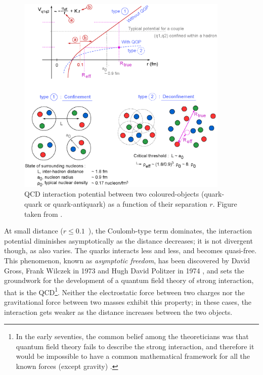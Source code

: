 \begin{figure}[t]
	\centering
	\includegraphics[width=0.9\textwidth]{Figs/Chapter2/GraphePotentiel.eps}
	\caption{QCD interaction potential between two coloured-objects (quark-quark or quark-antiquark) as a function of their separation $r$. Figure taken from \cite{maireProductionBaryonsMultietranges2011}.}
	\label{fig:QCDPotential}
\end{figure}

At small distance ($r \leq 0.1$~\fm), the Coulomb-type term dominates, the interaction potential diminishes asymptotically as the distance decreases; it is not divergent though, as \alphaS also varies. The quarks interacts less and less, and becomes quasi-free. This phenomenon, known as \textit{asymptotic freedom}, has been discovered by David Gross, Frank Wilczek in 1973 \cite{grossUltravioletBehaviorNonAbelian1973} and Hugh David Politzer in 1974 \cite{davidpolitzerAsymptoticFreedomApproach1974}, and sets the groundwork for the development of a quantum field theory of strong interaction, that is the QCD\footnote{In the early seventies, the common belief among the theoreticians was that quantum field theory fails to describe the strong interaction, and therefore it would be impossible to have a common mathematical framework for all the known forces (except gravity) \cite{s.glashowInteractionsJourneyMind1990}.}. Neither the electrostatic force between two charges nor the gravitational force between two masses exhibit this property; in these cases, the interaction gets weaker as the distance increases between the two objects.

